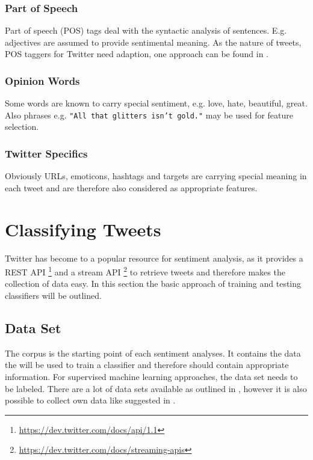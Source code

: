\documentclass{acm_proc_article-sp}
\begin{document}
\subsubsection{Part of Speech}
Part of speech (POS) tags deal with the syntactic analysis of sentences. E.g. adjectives are assumed to provide sentimental meaning. \cite{liu2010sentimentanalysis} As the nature of tweets, POS taggers for Twitter need adaption, one approach can be found in \cite{gimpel2011part}. 

\subsubsection{Opinion Words}
Some words are known to carry special sentiment, e.g. love, hate, beautiful, great. Also phrases e.g. \texttt{"All that glitters isn't gold."} may be used for feature selection. \cite{liu2010sentimentanalysis}

\subsubsection{Twitter Specifics}
Obviously URLs, emoticons, hashtags and targets are carrying special meaning in each tweet and are therefore also considered as appropriate features. \cite{gimpel2011part}

\section{Classifying Tweets} \label{classification}
Twitter has become to a popular resource for sentiment analysis, as it provides a REST API \footnote{\url{https://dev.twitter.com/docs/api/1.1}} and a stream API \footnote{\url{https://dev.twitter.com/docs/streaming-apis}} to retrieve tweets
and therefore makes the collection of data easy. 
In this section the basic approach of training and testing classifiers will be outlined.


\subsection{Data Set} The corpus is the starting point of each sentiment
analyses. It contains the data the will be used to train a classifier and therefore should contain appropriate information. For supervised machine learning approaches, the data set needs to be labeled. There are a lot of data sets available as outlined in \cite{kouloumpis2011twitter}, however it is also possible to collect own data like suggested in \cite{pak2010twitter}.
\end{document}
